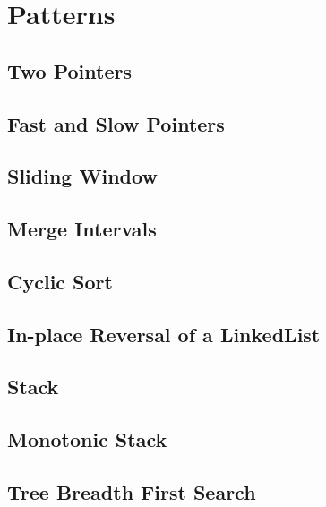 \chapter{Patterns}

\section{Two Pointers}





\section{Fast and Slow Pointers}


\section{Sliding Window}


\section{Merge Intervals}


\section{Cyclic Sort}


\section{In-place Reversal of a LinkedList}


\section{Stack}


\section{Monotonic Stack}




\section{Tree Breadth First Search}


